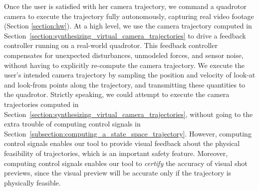 Once the user is satisfied with her camera trajectory, we command a quadrotor camera to execute the trajectory fully autonomously, capturing real video footage (Section \ref{section:hw}).
At a high level, we use the camera trajectory computed in Section~\ref{section:synthesizing_virtual_camera_trajectories} to drive a feedback controller running on a real-world quadrotor.
This feedback controller compensates for unexpected disturbances, unmodeled forces, and sensor noise, without having to explicitly re-compute the camera trajectory.
We execute the user's intended camera trajectory by sampling the position and velocity of look-at and look-from points along the trajectory, and transmitting these quantities to the quadrotor.
Strictly speaking, we could attempt to execute the camera trajectories computed in Section~\ref{section:synthesizing_virtual_camera_trajectories}, without going to the extra trouble of  computing control signals  in Section~\ref{subsection:computing_a_state_space_trajectory}.
However, computing control signals enables our tool to provide visual feedback about the physical feasibility of trajectories, which is an important safety feature. Moreover, computing control signals enables our tool to \emph{certify} the accuracy of visual shot previews, since the visual preview will be accurate only if the trajectory is physically feasible.
